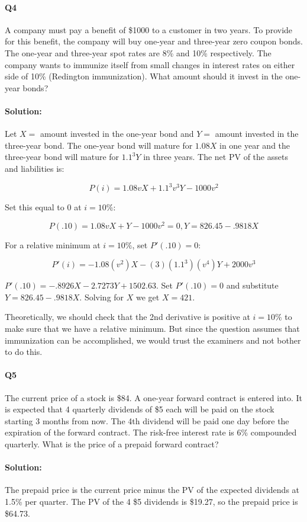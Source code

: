 \documentclass[a4paper, 11pt, twoside]{article}
\begin{document}
\paragraph{Q4} A company must pay a benefit of \$1000 to a customer in two years. To provide for this benefit, the company will buy one-year and three-year zero coupon bonds. The one-year and three-year spot rates are 8\% and 10\% respectively. The company wants to immunize itself from small changes in interest rates on either side of 10\% (Redington immunization). What amount should it invest in the one-year bonds?

\paragraph{Solution:} Let $X=$ amount invested in the one-year bond and $Y=$ amount invested in the three-year bond. The one-year bond will mature for $1.08X$ in one year and the three-year bond will mature for $1.1^3Y$ in three years. The net PV of the assets and liabilities is:

\[P(i)=1.08vX + 1.1^3v^3Y - 1000v^2\]

Set this equal to $0$ at $i=10\%$:

\[P(.10)=1.08vX + Y -1000v^2=0, Y=826.45- .9818X\]

For a relative minimum at $i=10\%$, set $P'(.10)=0$:

\[P'(i)=-1.08(v^2)X-(3)(1.1^3)(v^4)Y+2000v^3\]

$P'(.10)=-.8926X-2.7273Y+1502.63$. Set $P'(.10)=0$ and substitute $Y=826.45 - .9818X$. Solving for $X$ we get $X=421.$

Theoretically, we should check that the 2nd derivative is positive at $i=10\%$ to make sure that we have a relative minimum. But since the question assumes that immunization can be accomplished, we would trust the examiners and not bother to do this.

\paragraph{Q5} The current price of a stock is \$84. A one-year forward contract is entered into. It is expected that 4 quarterly dividends of \$5 each will be paid on the stock starting 3 months from now. The 4th dividend will be paid one day before the expiration of the forward contract. The risk-free interest rate is 6\% compounded quarterly. What is the price of a prepaid forward contract?

\paragraph{Solution:} The prepaid price is the current price minus the PV of the expected dividends at 1.5\% per quarter. The PV of the 4 \$5 dividends is \$19.27, so the prepaid price is \$64.73.
\end{document}
